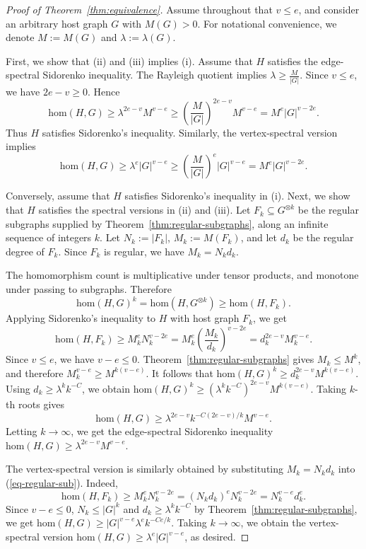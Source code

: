 \documentclass[11pt]{article}
\theoremstyle{definition}
\theoremstyle{plain}
\newcommand{\homc}{\mathrm{hom}}
\begin{document}
\begin{proof}[Proof of Theorem~\ref{thm:equivalence}]
Assume throughout that \(v\le e\), and consider an arbitrary host graph \(G\) with
\(M(G)>0\). For notational convenience, we denote $M:=M(G)$ and $\lambda:=\lambda(G).$

First, we show that (ii) and (iii) implies (i).  Assume that \(H\) satisfies the edge-spectral Sidorenko inequality.
The Rayleigh quotient implies $\lambda\ge \frac{M}{|G|}.$
Since \(v\le e\), we have \(2e-v\ge0\).  Hence
\[
\homc(H,G)\ge\lambda^{2e-v}M^{v-e}\ge
        \left(\frac{M}{|G|}\right)^{2e-v}M^{v-e}=
        M^e |G|^{v-2e}.
\]
Thus \(H\) satisfies Sidorenko's inequality. Similarly, the vertex-spectral version implies 
\[ \homc (H,G) \ge \lambda^{e}|G|^{v-e} \ge 
\left( \frac{M}{|G|}\right)^e |G|^{v-e} = M^e |G|^{v-2e}. \]

Conversely, assume that \(H\) satisfies Sidorenko's inequality in (i). Next, we show that $H$ satisfies the spectral versions in (ii) and (iii).   
Let \(F_k\subseteq G^{\otimes k}\) be the regular subgraphs supplied by
Theorem~\ref{thm:regular-subgraphs}, along an infinite sequence of
integers \(k\).  Let $N_k:=|F_k|$, $M_k:=M(F_k)$,
and let \(d_k\) be the regular degree of \(F_k\).  Since \(F_k\) is
regular, we have $M_k=N_kd_k.$

The homomorphism count is multiplicative under tensor products, and
monotone under passing to subgraphs.  Therefore
\[
        \homc(H,G)^k
        =
        \homc(H,G^{\otimes k})
        \ge
        \homc(H,F_k).
\]
Applying Sidorenko's inequality to \(H\) with host graph \(F_k\), we get
\begin{equation} \label{eq-regular-sub}
\homc(H,F_k)
        \ge
        M_k^e N_k^{v-2e}                                      =
        M_k^e\left(\frac{M_k}{d_k}\right)^{v-2e}              =
        d_k^{2e-v}M_k^{v-e}.
\end{equation}
Since \(v\le e\), we have \(v-e\le0\).  Theorem~\ref{thm:regular-subgraphs}
gives \(M_k\le M^k\), and therefore $M_k^{v-e}\ge M^{k(v-e)}$.
It follows that
$        \homc(H,G)^k
        \ge
        d_k^{2e-v}M^{k(v-e)}.$
Using \(d_k\ge \lambda^k k^{-C}\), we obtain $\homc(H,G)^k
        \ge
        \left(\lambda^k k^{-C}\right)^{2e-v}M^{k(v-e)}$.
Taking \(k\)-th roots gives
\[
        \homc(H,G)
        \ge
        \lambda^{2e-v}k^{-C(2e-v)/k}M^{v-e}.
\]
Letting \(k\to\infty\), we get the edge-spectral Sidorenko inequality $\homc(H,G)\ge \lambda^{2e-v}M^{v-e}$. 

The vertex-spectral version is similarly obtained by substituting $M_k=N_kd_k$ into (\ref{eq-regular-sub}). Indeed, 
\[ \homc(H,F_k) \ge M_k^e N_k^{v-2e} = (N_kd_k)^e N_k^{v-2e} =N_k^{v-e} d_k^e. \]
Since $v-e\le 0$, $N_k\le |G|^k$ and $d_k \ge \lambda^k k^{-C}$ by Theorem~\ref{thm:regular-subgraphs}, we get $\homc (H,G)\ge |G|^{v-e} \lambda^{e} k^{-Ce/k}$. Taking $k\to \infty$, we  obtain the vertex-spectral version $\homc(H,G) \ge \lambda^e |G|^{v-e}$, as desired.    
\end{proof}
\end{document}
